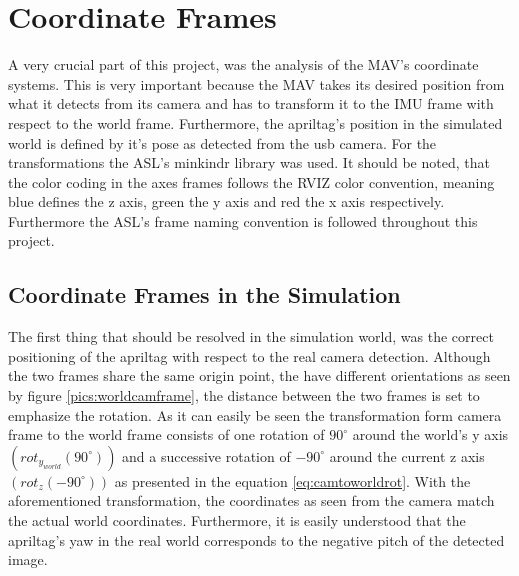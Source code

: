 \chapter{Coordinate Frames}
\label{sec:CoordianteFrames}

A very crucial part of this project, was the analysis of the MAV's coordinate systems. This is very important because the MAV takes its desired position from what it detects from its camera and has to transform it to the IMU frame with respect to the world frame. Furthermore, the apriltag's position in the simulated world is defined by it's pose as detected from the usb camera. For the transformations the ASL's minkindr library was used. It should be noted, that the color coding in the axes frames follows the RVIZ color convention, meaning blue defines the z axis, green the y axis and red the x axis respectively. Furthermore the ASL's frame naming convention \cite{FrameNamingConvention} is followed throughout this project. 

 \section{Coordinate Frames in the Simulation }
 \label{sec: CoordinatesinSimulation}
 
 The first thing that should be resolved in the simulation world, was the correct positioning of the apriltag with respect to the real camera detection. Although the two frames share the same origin point, the have different orientations as seen by figure \ref{pics:worldcamframe}, the distance between the two frames is set to emphasize the rotation. As it can easily be seen the transformation form camera frame to the world frame consists of one rotation of $90^{\circ}$ around the world's y axis $(rot_{y_{world}}(90^{\circ}))$ and a successive rotation of $-90^{\circ}$ around the current z axis $(rot_z(-90^{\circ}))$ as presented in the equation \ref{eq:camtoworldrot}. With the aforementioned transformation, the coordinates as seen from the camera match the actual world coordinates. Furthermore, it is easily understood that the apriltag's yaw in the real world corresponds to the negative pitch of the detected image.
 
